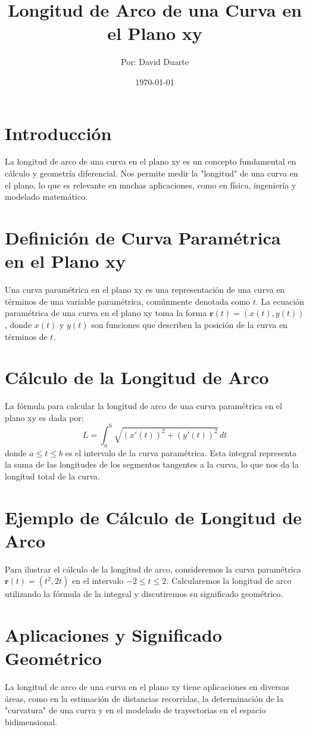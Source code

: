 \documentclass{article}
\begin{document}
	
	\title{Longitud de Arco de una Curva en el Plano xy}
	\author{Por: David Duarte}
	\date{\today}
	
	\maketitle
	
	\section*{Introducción}
	La longitud de arco de una curva en el plano xy es un concepto fundamental en cálculo y geometría diferencial. Nos permite medir la "longitud" de una curva en el plano, lo que es relevante en muchas aplicaciones, como en física, ingeniería y modelado matemático.
	
	\section*{Definición de Curva Paramétrica en el Plano xy}
	Una curva paramétrica en el plano xy es una representación de una curva en términos de una variable paramétrica, comúnmente denotada como $t$. La ecuación paramétrica de una curva en el plano xy toma la forma $\mathbf{r}(t) = (x(t), y(t))$, donde $x(t)$ y $y(t)$ son funciones que describen la posición de la curva en términos de $t$.
	
	\section*{Cálculo de la Longitud de Arco}
	La fórmula para calcular la longitud de arco de una curva paramétrica en el plano xy es dada por:
	\[ L = \int_{a}^{b} \sqrt{(x'(t))^2 + (y'(t))^2} \, dt \]
	donde $a \leq t \leq b$ es el intervalo de la curva paramétrica. Esta integral representa la suma de las longitudes de los segmentos tangentes a la curva, lo que nos da la longitud total de la curva.
	
	\section*{Ejemplo de Cálculo de Longitud de Arco}
	Para ilustrar el cálculo de la longitud de arco, consideremos la curva paramétrica $\mathbf{r}(t) = (t^2, 2t)$ en el intervalo $-2 \leq t \leq 2$. Calcularemos la longitud de arco utilizando la fórmula de la integral y discutiremos su significado geométrico.
	
	\section*{Aplicaciones y Significado Geométrico}
	La longitud de arco de una curva en el plano xy tiene aplicaciones en diversas áreas, como en la estimación de distancias recorridas, la determinación de la "curvatura" de una curva y en el modelado de trayectorias en el espacio bidimensional.
	

	
\end{document}
